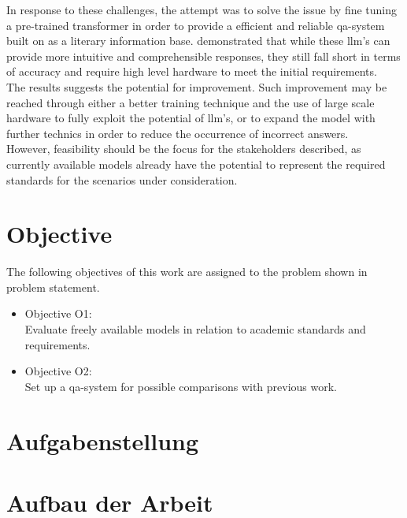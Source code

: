 In response to these challenges, the attempt was to solve the issue by fine tuning a pre-trained transformer in order to provide a efficient and reliable \ac{qa}-system built on \citet{bb2} as a literary information base.
\citet{Paul_Keller} demonstrated that while these \ac{llm}'s can provide more intuitive and comprehensible responses, they still fall short in terms of accuracy and require high level hardware to meet the initial requirements.\\ 
%
The results suggests the potential for improvement. 
Such improvement may be reached through either a better training technique and the use of large scale hardware to fully exploit the potential of \ac{llm}'s, or to expand the model with further technics in order to reduce the occurrence of incorrect answers.\\
%
However, feasibility should be the focus for the stakeholders described, as currently available models already have the potential to represent the required standards for the scenarios under consideration. 
 
\section{Objective}\label{sec:objective}
The following objectives of this work are assigned to the problem shown in {problem statement}.
\begin{itemize}
  \item Objective O1:\\ 
  Evaluate freely available models in relation to academic standards and requirements.
  \item Objective O2:\\ 
  Set up a \ac{qa}-system for possible comparisons with previous work.
\end{itemize}
\section{Aufgabenstellung}



\section{Aufbau der Arbeit}
